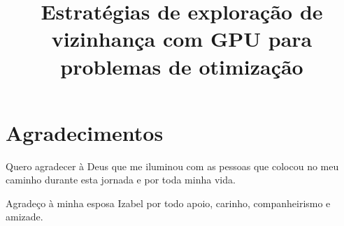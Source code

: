 \documentclass[titlepage,a4paper,oneside,onecolumn,12pt]{report}
\title{Estratégias de exploração de vizinhança com GPU para problemas de otimização}
\begin{document}
\capa
\folhaderosto


\begin{folhadeaprovacao}
\end{folhadeaprovacao}

%    

%    

\chapter*{\textbf{\normalsize{Agradecimentos}}}

Quero agradecer à Deus que me iluminou com as pessoas que colocou no meu caminho durante esta jornada e por toda minha vida.

Agradeço à minha esposa Izabel por todo apoio, carinho, companheirismo e amizade.
\end{document}

